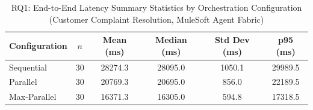 \begin{table}[t]
        \centering
        \caption{RQ1: End-to-End Latency Summary Statistics by Orchestration Configuration (Customer Complaint Resolution, MuleSoft Agent Fabric)}
        \label{tab:rq1_latency}
        \begin{tabular}{lccccc}
        \hline
        \textbf{Configuration} & \textbf{$n$} & \textbf{Mean (ms)} & \textbf{Median (ms)} & \textbf{Std Dev (ms)} & \textbf{p95 (ms)} \\
\hline
        Sequential & 30 & 28274.3 & 28095.0 & 1050.1 & 29989.5 \\
Parallel & 30 & 20769.3 & 20695.0 & 856.0 & 22189.5 \\
Max-Parallel & 30 & 16371.3 & 16305.0 & 594.8 & 17318.5 \\
        \hline
        \end{tabular}
        \end{table}

